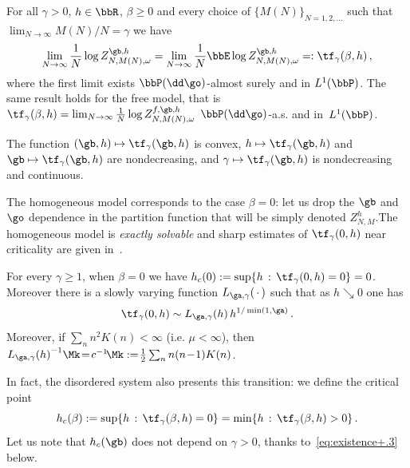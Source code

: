 \begin{theo}\label{th:fq}
For all $\gamma>0$, $h \in \bbR$, $\beta \ge 0$ and every choice of $\{M(N)\}_{N=1,2, \ldots}$ such that $\lim_{N\to\infty} M(N)/N=\gamma$ we have
\begin{equation}\label{eq:saf}
\lim_{N\to\infty} \frac{1}{N} \log Z^{\gb,h}_{N,M(N),\omega} = \lim_{N\to\infty} \frac{1}{N} \bbE \log Z^{\gb,h}_{N,M(N),\omega} =: \tf_{\gamma}(\beta,h)\,,
\end{equation}
where the first limit exists $\bbP(\dd \go)$-almost surely and in $L^1(\bbP)$. The same result holds for the free model, that is $\tf_{\gamma}(\beta,h) = \lim_{N\to\infty} \frac{1}{N} \log Z^{f,\gb,h}_{N,M(N),\omega}$ $\bbP(\dd \go)$-a.s. and in~$L^1(\bbP)$.

The function $(\gb,h) \mapsto \tf_{\gamma}(\gb,h)$ is convex, $h\mapsto \tf_{\gamma}(\gb,h)$ and $\gb\mapsto \tf_{\gamma}(\gb,h)$ are nondecreasing, and $\gamma \mapsto \tf_{\gamma}(\gb,h)$ is nondecreasing and continuous.
\end{theo}

The homogeneous model corresponds to the case $\beta = 0$: let us drop the $\gb$ and $\go$ dependence in the partition function that will be simply denoted $Z_{N, M}^h$.\linebreak The homogeneous model is \emph{exactly solvable} and sharp estimates of $\tf_\gamma (0,h)$ near criticality are given in~\cite{cf:GK}.

\begin{theo}[\cite{cf:GK}]\label{th:beta0}
For every $\gamma \ge 1$, when $\beta=0$ we have $h_c(0) := \sup\{ h\,:\,\tf_{\gamma}(0,h)=0\}= 0$. Moreover there is a slowly varying function $L_{\ga, \gamma}({\,\cdot\,})$ such that as $h \searrow 0$ one has
\begin{equation}
\tf_\gamma (0,h) \sim L_{\ga,\gamma} (h)\,h^{1/ \min (1, \ga)}\,.
\end{equation}
Moreover, if $\sum_n n^2 K(n) \!<\! \infty$ (i.e. $\mu\!<\!\infty$), then ${L_{\ga,\gamma}(h)}^{-1} \Mk\!=\! c^{-1} \!\Mk:=\! \frac{1}{2} \sum_{n } n(n\!-\!1) K(n)$.
\end{theo}

In fact, the disordered system also presents this transition: we define the critical point
\begin{equation}
h_c(\beta) := \sup \lbrace h\,:\,\tf_\gamma (\beta,h) = 0 \rbrace = \min \lbrace h\,:\,\tf_\gamma (\beta,h) >0 \rbrace\,.
\end{equation}
Let us note that $h_c(\gb)$ does not depend on $\gamma >0$, thanks to~\eqref{eq:existence+.3} below.


